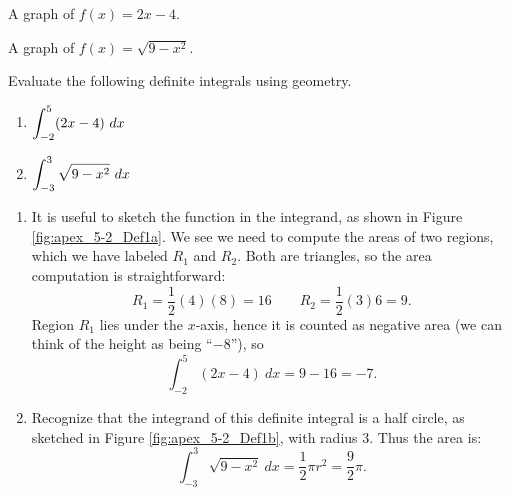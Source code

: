 \begin{marginfigure} %
\caption{A graph of $f(x) = 2x-4$.} \label{fig:apex_5-2_Def1a}
\end{marginfigure}

\begin{marginfigure}[1cm] %
\caption{A graph of $f(x) = \sqrt{9-x^2}$.} \label{fig:apex_5-2_Def1b}
\end{marginfigure}

\begin{example} %
Evaluate the following definite integrals using geometry.
\begin{multicols}{2}
\begin{enumerate}[1),leftmargin=*]
\item $\ds \int_{-2}^5 (2x-4) \ dx$
\item $\ds \int_{-3}^3 \sqrt{9-x^2} \ dx$
\end{enumerate}
\end{multicols}

\solution
\begin{enumerate}[1),leftmargin=*]
\item It is useful to sketch the function in the integrand, as shown in Figure \ref{fig:apex_5-2_Def1a}. We see we need to compute the areas of two regions, which we have labeled $R_1$ and $R_2$. Both are triangles, so the area computation is straightforward:
\[ R_1 = \frac{1}{2}(4)(8) = 16 \qquad R_2 = \frac{1}{2}(3)6 = 9.\]
Region $R_1$ lies under the $x$-axis, hence it is counted as negative area (we can think of the height as being ``$-8$''), so 
\[ \int_{-2}^5(2x-4)\ dx = 9-16 = -7. \]

\item Recognize that the integrand of this definite integral is a half circle, as sketched in Figure \ref{fig:apex_5-2_Def1b}, with radius $3$. Thus the area is:
\[ \int_{-3}^3 \sqrt{9-x^2}\ dx = \frac{1}{2}\pi r^2 = \frac{9}{2}\pi. \]
\end{enumerate}
\end{example}  